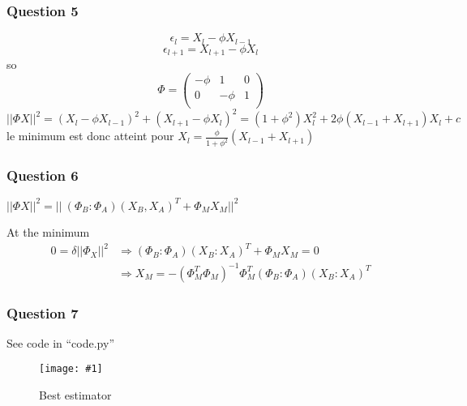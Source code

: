 \documentclass[12pt,french]{article}
\newcommand{\Q}[1]{\subsubsection*{Question #1}}
\newcommand{\IMG}[3]{
\begin{figure}[H]
\texttt{[image: \#1]}%
\caption{#2}%
\label{#1}%
\end{figure}
}
\begin{document}
\Q{5}
$$\epsilon_l = X_l - \phi X_{l-1}$$
$$\epsilon_{l+1} = X_{l+1} - \phi X_l$$
so
$$\Phi = 
\left(
  \begin{array}{ccc}
    -\phi & 1 & 0 \\
    0 & -\phi & 1 \\
  \end{array}
  \right)
$$
$$ ||\Phi X ||^2 = (X_l-\phi X_{l-1})^2 + (X_{l+1}-\phi X_l)^2 = (1+\phi^2)X_l^2 + 2 \phi (X_{l-1} + X_{l+1}) X_l + c$$
le minimum est donc atteint pour $X_l = \frac{\phi}{1+\phi^2} (X_{l-1}+X_{l+1})$


\Q{6}
$||\Phi X||^2 = ||\ (\Phi_B : \Phi_A) (X_B , X_A)^T + \Phi_M X_M||^2$

At the minimum
\begin{align*}
  0 = \delta ||\Phi_X||^2 &\Rightarrow (\Phi_B : \Phi_A) (X_B : X_A)^T + \Phi_M X_M = 0 \\
  &\Rightarrow X_M = -(\Phi_M^T \Phi_M)^{-1} \Phi_M^T(\Phi_B : \Phi_A) (X_B : X_A)^T
\end{align*}

\Q{7}
See code in  ``code.py''

\IMG{figure.png}{Best estimator}{0.25}
\end{document}
